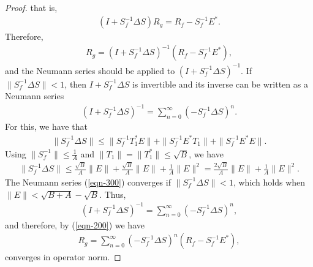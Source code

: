 \documentclass[12pt,titlepage]{amsart}
\theoremstyle{definition}
\theoremstyle{remark}
\begin{document}
\begin{proof}
that is,
\begin{eqnarray*}
(I + S_f^{-1} \Delta S) R_g = R_f - S_f^{-1} E^*.
\end{eqnarray*}
Therefore,
\begin{eqnarray} \label{eqn-200}
 R_g = (I + S_f^{-1} \Delta S)^{-1} (R_f - S_f^{-1} E^*),
\end{eqnarray}
and the Neumann series should be applied to $(I + S_f^{-1} \Delta
S)^{-1}$. If $\|S_f^{-1}\Delta S\| < 1$, then $I + S_f^{-1} \Delta
S$ is invertible and its inverse can be written as a Neumann
series
\begin{eqnarray} \label{eqn-300}
(I + S_f^{-1} \Delta S)^{-1}=\sum_{n=0}^{\infty} (-S_f^{-1} \Delta
S)^{n}.
\end{eqnarray}
For this, we have that
\begin{eqnarray*}
\|S_f^{-1} \Delta S\| \le \|S_f^{-1} T_1^* E\| + \|S_f^{-1} E^*
T_1\| + \|S_f^{-1} E^* E\|.
\end{eqnarray*}
Using $\|S_f^{-1}\| \le \frac{1}{A}$ and $\|T_1\| = \|T_1^*\| \le
\sqrt{B}$, we have
\begin{eqnarray*}
\|S_f^{-1} \Delta S\| \le \frac{\sqrt{B}}{A} \|E\| +
\frac{\sqrt{B}}{A} \|E\| + \frac{1}{A} \|E\|^2 = \frac{2
\sqrt{B}}{A} \|E\| + \frac{1}{A} \|E\|^2.
\end{eqnarray*}
The Neumann series (\ref{eqn-300}) converges if $\|S_f^{-1} \Delta
S\| < 1$, which holds when $\|E\| < \sqrt{B + A} - \sqrt{B}$.
Thus,
\begin{eqnarray*}
(I + S_f^{-1} \Delta S)^{-1} = \sum_{n=0}^{\infty} (-S_f^{-1}
\Delta S)^n,
\end{eqnarray*}
and therefore, by (\ref{eqn-200}) we have
\begin{eqnarray*}
R_g = \sum_{n=0}^{\infty} (-S_f^{-1} \Delta S)^n (R_f - S_f^{-1}
E^*),
\end{eqnarray*}
converges in operator norm.
\end{proof}
\end{document}

